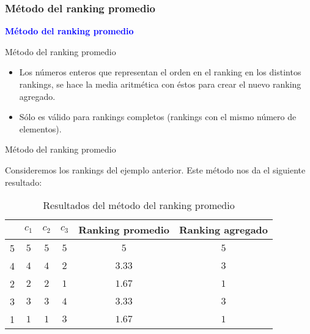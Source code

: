 \documentclass[10pt]{beamer}
\begin{document}
	\subsubsection{Método del ranking promedio}
	
	\begin{frame}
		\begin{center}
			\Huge\textbf{\textsf{\textcolor{blue}{Método del ranking promedio}}}
		\end{center}
	\end{frame}
	
	\begin{frame}{Método del ranking promedio}
		\begin{itemize}
			\item Los números enteros que representan el orden en el ranking en los distintos rankings, se hace la media aritmética con éstos para crear el nuevo ranking agregado.
			
			\item Sólo es válido para rankings completos (rankings con el mismo número de elementos).
		\end{itemize}
	\end{frame}
	
	\begin{frame}{Método del ranking promedio}
		\begin{ejemplo}
			Consideremos los rankings del ejemplo anterior. Este método nos da el siguiente resultado:
			
			\begin{table}[h]
				\centering
				\caption{Resultados del método del ranking promedio}
				\label{tbl:promedio_resultados}
				\begin{tabular}{@{}cccccc@{}}
					\cmidrule(l){2-6}
					& $c_1$ & $c_2$ & $c_3$ & Ranking promedio & Ranking agregado \\ \midrule
					5 & $5$    & $5$    & $5$    & $5$              & $5$              \\
					4 & $4$    & $4$    & $2$    & $3.33$           & $3$              \\
					2 & $2$    & $2$    & $1$    & $1.67$           & $1$              \\
					3 & $3$    & $3$    & $4$    & $3.33$           & $3$              \\
					1 & $1$    & $1$    & $3$    & $1.67$           & $1$              \\ \bottomrule
				\end{tabular}
			\end{table} 
		\end{ejemplo}
	\end{frame}
	
\end{document}
